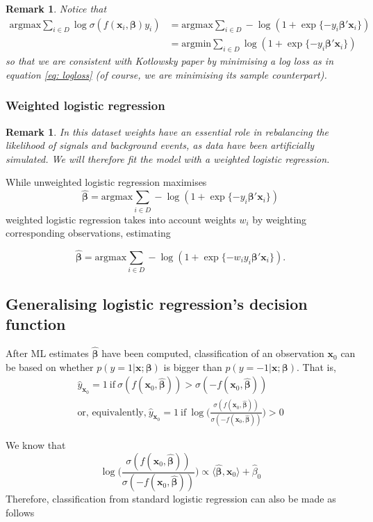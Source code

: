 \documentclass[]{article}
\newcommand{\x}{\mathbf{x}}
\newcommand{\bbeta}{\boldsymbol \beta}
\newtheorem{remark}[theorem]{Remark}
\begin{document}
\begin{remark}
Notice that 
\begin{align*}
\text{argmax}\sum_{i\in D}\log\sigma(f(\x_i,\bbeta)y_i)&=\text{argmax}\sum_{i\in D}-\log(1+\exp\{-y_i\bbeta'\x_i \}) \\
&=\text{argmin}\sum_{i\in D}\log(1+\exp\{- y_i\bbeta'\x_i\})
\end{align*} so that we are consistent with Kotlowsky paper by minimising a log loss as in equation \ref{eq: logloss} (of course, we are minimising its sample counterpart).
\end{remark}
\subsubsection{Weighted logistic regression}
\begin{remark}
In this dataset weights have an essential role in rebalancing the likelihood of signals and background events, as data have been artificially simulated. We will therefore fit the model with a weighted logistic regression.
\end{remark}

While unweighted logistic regression maximises 
$$\hat{\bbeta}=\text{argmax}\sum_{i\in D}-\log(1+\exp\{-y_i\bbeta'\x_i \})$$
weighted logistic regression takes into account weights $w_i$ by weighting corresponding observations, estimating

$$\hat{\bbeta}=\text{argmax}\sum_{i\in D}-\log(1+\exp\{-w_i y_i\bbeta'\x_i \}).$$

\subsection{Generalising logistic regression's decision function}
\label{app:decision function}

After ML estimates $\hat{\bbeta}$ have been computed, classification of an observation $\x_0$ can be based on whether $p(y=1|\x;\bbeta)$ is bigger than $p(y=-1|\x;\bbeta)$. That is,
\begin{align*}
\hat{y}_{\x_0}=1 \ \text{if} \ \sigma(f(\x_0,\hat{\bbeta}))>\sigma(-f(\x_0,\hat{\bbeta})) \\
\text{or, equivalently,} \
\hat{y}_{\x_0}=1  \ \text{if} \ \log \Big( \frac{\sigma(f(\x_0,\hat{\bbeta}))}{\sigma(-f(\x_0,\hat{\bbeta}))}\Big)>0
\end{align*} 

We know that $$\log \Big( \frac{\sigma(f(\x_0,\hat{\bbeta}))}{\sigma(-f(\x_0,\hat{\bbeta}))}\Big)\propto \langle\hat{\bbeta},\x_0\rangle+\hat{\beta}_0$$
Therefore, classification from standard logistic regression can also be made as follows
\end{document}
